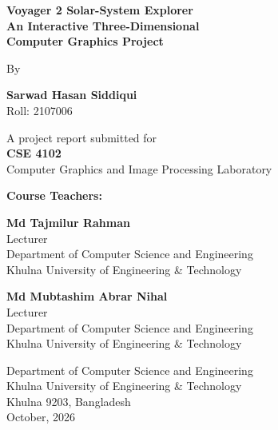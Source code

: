 \documentclass[12pt,a4paper,oneside]{report}
\newcommand{\manualpage}{\clearpage}
\begin{document}
\begin{center}
{\fontsize{18}{27}\selectfont\bfseries Voyager 2 Solar-System Explorer\\An Interactive Three-Dimensional\\Computer Graphics Project\par}
\vspace{54pt}
By\par\vspace{36pt}
\textbf{Sarwad Hasan Siddiqui}\\Roll: 2107006\par
\vspace{30pt}
A project report submitted for\\
\textbf{CSE 4102}\\
Computer Graphics and Image Processing Laboratory\par
\end{center}
\vspace{24pt}
\textbf{Course Teachers:}\par
\hspace*{0.8in}\begin{minipage}{0.8\textwidth}
\textbf{Md Tajmilur Rahman}\\Lecturer\\
Department of Computer Science and Engineering\\
Khulna University of Engineering \& Technology\par\vspace{12pt}
\textbf{Md Mubtashim Abrar Nihal}\\Lecturer\\
Department of Computer Science and Engineering\\
Khulna University of Engineering \& Technology
\end{minipage}
\vfill
\begin{center}Department of Computer Science and Engineering\\Khulna University of Engineering \& Technology\\Khulna 9203, Bangladesh\\October, 2026\end{center}
\manualpage
\end{document}
